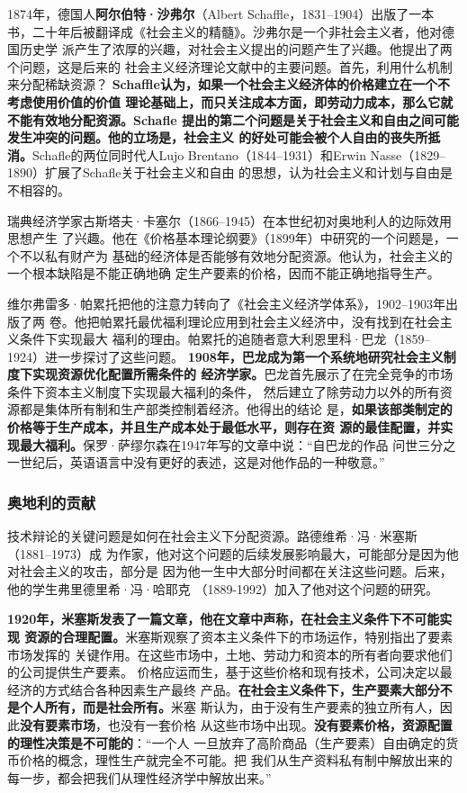 1874年，德国人\textbf{阿尔伯特·沙弗尔}（Albert Schaffle，1831--1904）出版了一本
书，二十年后被翻译成《社会主义的精髓》。沙弗尔是一个非社会主义者，他对德国历史学
派产生了浓厚的兴趣，对社会主义提出的问题产生了兴趣。他提出了两个问题，这是后来的
社会主义经济理论文献中的主要问题。首先，利用什么机制来分配稀缺资源？
\textbf{Schaffle认为，如果一个社会主义经济体的价格建立在一个不考虑使用价值的价值
理论基础上，而只关注成本方面，即劳动力成本，那么它就不能有效地分配资源。Schafle
提出的第二个问题是关于社会主义和自由之间可能发生冲突的问题。他的立场是，社会主义
的好处可能会被个人自由的丧失所抵消。}Schafle的两位同时代人Lujo
Brentano（1844--1931）和Erwin Nasse（1829--1890）扩展了Schafle关于社会主义和自由
的思想，认为社会主义和计划与自由是不相容的。

瑞典经济学家古斯塔夫·卡塞尔（1866--1945）在本世纪初对奥地利人的边际效用思想产生
了兴趣。他在《价格基本理论纲要》（1899年）中研究的一个问题是，一个不以私有财产为
基础的经济体是否能够有效地分配资源。他认为，社会主义的一个根本缺陷是不能正确地确
定生产要素的价格，因而不能正确地指导生产。

维尔弗雷多·帕累托把他的注意力转向了《社会主义经济学体系》，1902--1903年出版了两
卷。他把帕累托最优福利理论应用到社会主义经济中，没有找到在社会主义条件下实现最大
福利的理由。帕累托的追随者意大利恩里科·巴龙（1859--1924）进一步探讨了这些问题。
\textbf{1908年，巴龙成为第一个系统地研究社会主义制度下实现资源优化配置所需条件的
经济学家。}巴龙首先展示了在完全竞争的市场条件下资本主义制度下实现最大福利的条件，
然后建立了除劳动力以外的所有资源都是集体所有制和生产部类控制着经济。他得出的结论
是，\textbf{如果该部类制定的价格等于生产成本，并且生产成本处于最低水平，则存在资
源的最佳配置，并实现最大福利。}保罗·萨缪尔森在1947年写的文章中说：“自巴龙的作品
问世三分之一世纪后，英语语言中没有更好的表述，这是对他作品的一种敬意。”

\subsubsection{奥地利的贡献}

技术辩论的关键问题是如何在社会主义下分配资源。路德维希·冯·米塞斯（1881--1973）成
为作家，他对这个问题的后续发展影响最大，可能部分是因为他对社会主义的攻击，部分是
因为他一生中大部分时间都在关注这些问题。后来，他的学生弗里德里希·冯·哈耶克
（1889-1992）加入了他对这个问题的研究。

\textbf{1920年，米塞斯发表了一篇文章，他在文章中声称，在社会主义条件下不可能实现
资源的合理配置。}米塞斯观察了资本主义条件下的市场运作，特别指出了要素市场发挥的
关键作用。在这些市场中，土地、劳动力和资本的所有者向要求他们的公司提供生产要素。
价格应运而生，基于这些价格和现有技术，公司决定以最经济的方式结合各种因素生产最终
产品。\textbf{在社会主义条件下，生产要素大部分不是个人所有，而是社会所有。}米塞
斯认为，由于没有生产要素的独立所有人，因此\textbf{没有要素市场}，也没有一套价格
从这些市场中出现。\textbf{没有要素价格，资源配置的理性决策是不可能的}：“一个人
一旦放弃了高阶商品（生产要素）自由确定的货币价格的概念，理性生产就完全不可能。把
我们从生产资料私有制中解放出来的每一步，都会把我们从理性经济学中解放出来。”

